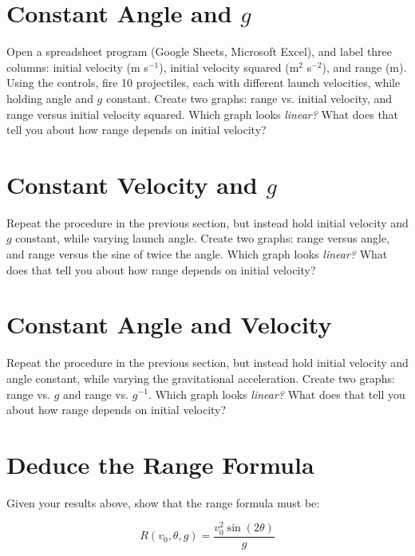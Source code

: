 \documentclass{article}
\begin{document}
\section{Constant Angle and $g$}

Open a spreadsheet program (Google Sheets, Microsoft Excel), and label three columns: initial velocity (m s$^{-1}$), initial velocity squared (m$^2$ s$^{-2}$), and range (m).  Using the controls, fire 10 projectiles, each with different launch velocities, while holding angle and $g$ constant.  Create two graphs: range vs. initial velocity, and range versus initial velocity squared.  Which graph looks \textit{linear?}  What does that tell you about how range depends on initial velocity?

\section{Constant Velocity and $g$}

Repeat the procedure in the previous section, but instead hold initial velocity and $g$ constant, while varying launch angle.  Create two graphs: range versus angle, and range versus the sine of twice the angle.  Which graph looks \textit{linear?}  What does that tell you about how range depends on initial velocity?

\section{Constant Angle and Velocity}

Repeat the procedure in the previous section, but instead hold initial velocity and angle constant, while varying the gravitational acceleration.  Create two graphs: range vs. $g$ and range vs. $g^{-1}$.  Which graph looks \textit{linear?}  What does that tell you about how range depends on initial velocity?

\section{Deduce the Range Formula}

Given your results above, show that the range formula must be:

\begin{equation}
R(v_0,\theta,g) = \frac{v_0^2\sin(2\theta)}{g}
\end{equation}
\end{document}
